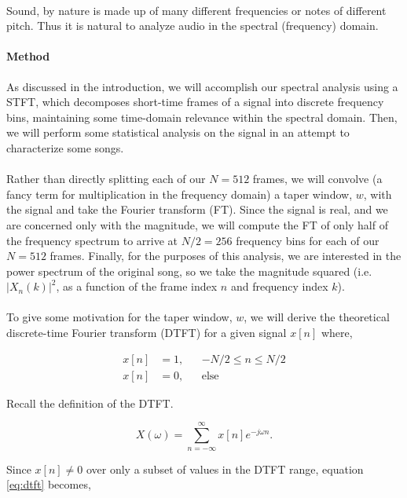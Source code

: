 \documentclass[11pt,a4paper]{article}
\begin{document}
\paragraph*{} Sound, by nature is made up of many different frequencies or notes of different pitch. Thus it is natural to analyze audio in the spectral (frequency) domain. 
\paragraph{Method} As discussed in the introduction, we will accomplish our spectral analysis using a STFT, which decomposes short-time frames of a signal into discrete frequency bins, maintaining some time-domain relevance within the spectral domain. Then, we will perform some statistical analysis on the signal in an attempt to characterize some songs.
\paragraph*{} Rather than directly splitting each of our $N=512$ frames, we will convolve (a fancy term for multiplication in the frequency domain) a taper window, $w$, with the signal and take the Fourier transform (FT). Since the signal is real, and we are concerned only with the magnitude, we will compute the FT of only half of the frequency spectrum to arrive at $N/2=256$ frequency bins for each of our $N=512$ frames. Finally, for the purposes of this analysis, we are interested in the power spectrum of the original song, so we take the magnitude squared (i.e. $|X_n(k)|^2$, as a function of the frame index $n$ and frequency index $k$).
\paragraph*{} To give some motivation for the taper window, $w$, we will derive the theoretical discrete-time Fourier transform (DTFT) for a given signal $x[n]$ where,

\begin{align*}
x[n] &= 1, && -N/2 \leq n \leq N/2 \\
x[n] &= 0, && \text{else}
\end{align*}

Recall the definition of the DTFT.

\begin{equation} \label{eq:dtft}
X(\omega)=\sum_{n=-\infty}^{\infty} x[n]e^{-j\omega n}.
\end{equation}

Since $x[n]\neq 0$ over only a subset of values in the DTFT range, equation \eqref{eq:dtft} becomes,
\end{document}
